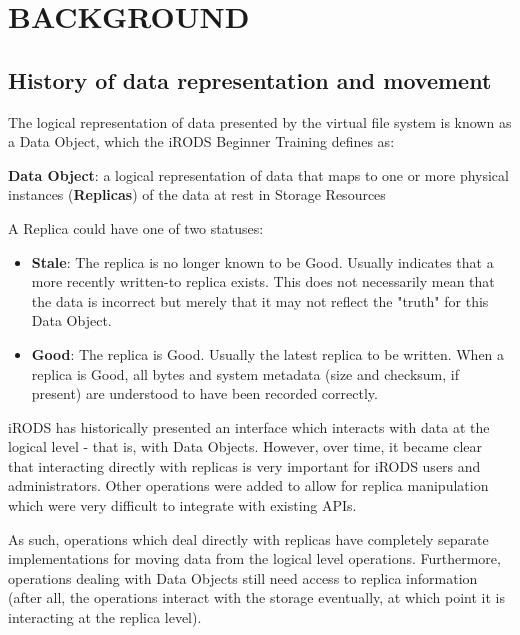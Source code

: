 \documentclass{irodsugm}
\begin{document}
\section*{BACKGROUND}

\subsection*{History of data representation and movement}

The logical representation of data presented by the virtual file system is known as a Data Object, which the iRODS Beginner Training\cite{beginnertraining} defines as:

\begin{displayquote}
\textbf{Data Object}: a logical representation of data that maps to one or more physical instances (\textbf{Replicas}) of the data at rest in Storage Resources
\end{displayquote}

A Replica could have one of two statuses:

\begin{itemize}
\item \textbf{Stale}: The replica is no longer known to be Good. Usually indicates that a more recently written-to replica exists. This does not necessarily mean that the data is incorrect but merely that it may not reflect the "truth" for this Data Object.
\item \textbf{Good}: The replica is Good. Usually the latest replica to be written. When a replica is Good, all bytes and system metadata (size and checksum, if present) are understood to have been recorded correctly.
\end{itemize}

iRODS has historically presented an interface which interacts with data at the logical level - that is, with Data Objects. However, over time, it became clear that interacting directly with replicas is very important for iRODS users and administrators. Other operations were added to allow for replica manipulation which were very difficult to integrate with existing APIs.

As such, operations which deal directly with replicas have completely separate implementations for moving data from the logical level operations. Furthermore, operations dealing with Data Objects still need access to replica information (after all, the operations interact with the storage eventually, at which point it is interacting at the replica level). 
\end{document}

